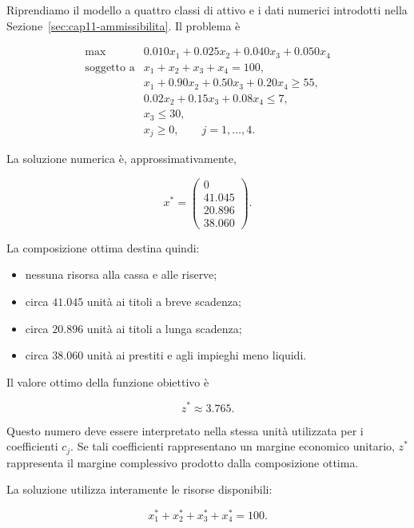Riprendiamo il modello a quattro classi di attivo e i dati numerici introdotti
nella Sezione~\ref{sec:cap11-ammissibilita}. Il problema \`e

\[
\begin{array}{ll}
\max
&
0.010x_1+0.025x_2+0.040x_3+0.050x_4
\\[4pt]
\mbox{soggetto a}
&
x_1+x_2+x_3+x_4=100,
\\[2pt]
&
x_1+0.90x_2+0.50x_3+0.20x_4\geq55,
\\[2pt]
&
0.02x_2+0.15x_3+0.08x_4\leq7,
\\[2pt]
&
x_3\leq30,
\\[2pt]
&
x_j\geq0,
\qquad
j=1,\ldots,4.
\end{array}
\]

La soluzione numerica \`e, approssimativamente,

\[
x^*
=
\begin{pmatrix}
0\\
41.045\\
20.896\\
38.060
\end{pmatrix}.
\]

La composizione ottima destina quindi:

\begin{itemize}

\item nessuna risorsa alla cassa e alle riserve;

\item circa $41.045$ unit\`a ai titoli a breve scadenza;

\item circa $20.896$ unit\`a ai titoli a lunga scadenza;

\item circa $38.060$ unit\`a ai prestiti e agli impieghi meno liquidi.

\end{itemize}

Il valore ottimo della funzione obiettivo \`e

\[
z^*
\approx
3.765.
\]

Questo numero deve essere interpretato nella stessa unit\`a utilizzata per i
coefficienti $c_j$. Se tali coefficienti rappresentano un margine economico
unitario, $z^*$ rappresenta il margine complessivo prodotto dalla composizione
ottima.

La soluzione utilizza interamente le risorse disponibili:

\[
x_1^*+x_2^*+x_3^*+x_4^*
=
100.
\]

